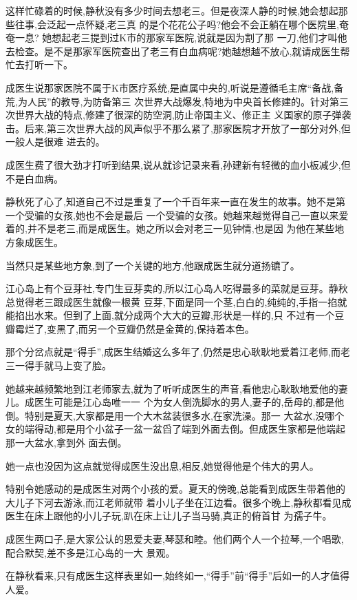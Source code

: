 ﻿\documentclass[12pt]{article}
\begin{document}
这样忙碌着的时候,静秋没有多少时间去想老三。但是夜深人静的时候,她会想起那些往事,会泛起一点怀疑,老三真
的是个花花公子吗?他会不会正躺在哪个医院里,奄奄一息? 她想起老三提到过K市的那家军医院,说就是因为割了那
一刀,他们才叫他去检查。是不是那家军医院查出了老三有白血病呢?她越想越不放心,就请成医生帮忙去打听一下。

成医生说那家医院不属于K市医疗系统,是直属中央的,听说是遵循毛主席``备战,备荒,为人民''的教导,为防备第三
次世界大战爆发,特地为中央首长修建的。针对第三次世界大战的特点,修建了很深的防空洞,防止帝国主义、修正主
义国家的原子弹袭击。后来,第三次世界大战的风声似乎不那么紧了,那家医院才开放了一部分对外,但一般人是很难
进去的。

成医生费了很大劲才打听到结果,说从就诊记录来看,孙建新有轻微的血小板减少,但不是白血病。

静秋死了心了,知道自己不过是重复了一个千百年来一直在发生的故事。她不是第一个受骗的女孩,她也不会是最后
一个受骗的女孩。她越来越觉得自己一直以来爱着的,并不是老三,而是成医生。她之所以会对老三一见钟情,也是因
为他在某些地方象成医生。

当然只是某些地方象,到了一个关键的地方,他跟成医生就分道扬镳了。

江心岛上有个豆芽社,专门生豆芽卖的,所以江心岛人吃得最多的菜就是豆芽。静秋总觉得老三跟成医生就像一根黄
豆芽,下面是同一个茎,白白的,纯纯的,手指一掐就能掐出水来。但到了上面,就分成两个大大的豆瓣,形状是一样的,只
不过有一个豆瓣霉烂了,变黑了,而另一个豆瓣仍然是金黄的,保持着本色。

那个分岔点就是``得手'',成医生结婚这么多年了,仍然是忠心耿耿地爱着江老师,而老三一得手就马上变了脸。

她越来越频繁地到江老师家去,就为了听听成医生的声音,看他忠心耿耿地爱他的妻儿。成医生可能是江心岛唯一一
个为女人倒洗脚水的男人,妻子的,岳母的,都是他倒。特别是夏天,大家都是用一个大木盆装很多水,在家洗澡。那一
大盆水,没哪个女的端得动,都是用个小盆子一盆一盆舀了端到外面去倒。但成医生家都是他端起那一大盆水,拿到外
面去倒。

她一点也没因为这点就觉得成医生没出息,相反,她觉得他是个伟大的男人。

特别令她感动的是成医生对两个小孩的爱。夏天的傍晚,总能看到成医生带着他的大儿子下河去游泳,而江老师就带
着小儿子坐在江边看。很多个晚上,静秋都看见成医生在床上跟他的小儿子玩,趴在床上让儿子当马骑,真正的俯首甘
为孺子牛。

成医生两口子,是大家公认的恩爱夫妻,琴瑟和睦。他们两个人一个拉琴,一个唱歌,配合默契,差不多是江心岛的一大
景观。

在静秋看来,只有成医生这样表里如一,始终如一,``得手''前``得手''后如一的人才值得人爱。
\end{document}
